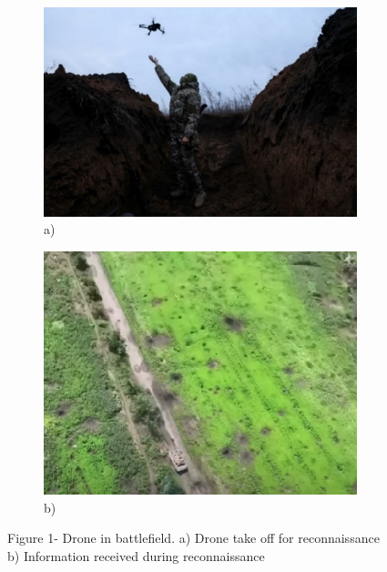 \begin{figure}[H]
    \centering
    \begin{subfigure}[b]{0.45\textwidth}
        \centering
        \includegraphics[width=\linewidth]{assets/10}
        \caption*{a)}
    \end{subfigure}\hfill
    \begin{subfigure}[b]{0.45\textwidth}
        \centering
        \includegraphics[width=\linewidth]{assets/11}
        \caption*{b)}
    \end{subfigure}
	\caption*{Figure 1- Drone in battlefield. a) Drone take off for reconnaissance b) Information received during reconnaissance}
\end{figure}

